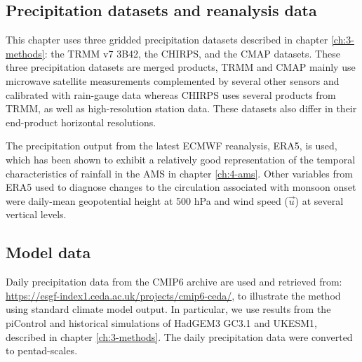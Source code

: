 \subsection{Precipitation datasets and reanalysis data}

This chapter uses three gridded precipitation datasets described in chapter \ref{ch:3-methods}: the TRMM v7 3B42, the CHIRPS, and the CMAP datasets.
These three precipitation datasets are merged products, TRMM and CMAP mainly use microwave satellite measurements complemented by several other sensors and calibrated with rain-gauge data whereas CHIRPS uses several products from TRMM, as well as high-resolution station data. These datasets also differ in their end-product horizontal resolutions.

The precipitation output from the latest ECMWF reanalysis, ERA5, is used, which has been shown to exhibit a relatively good representation of the temporal characteristics of rainfall in the AMS in chapter \ref{ch:4-ams}. 
Other variables from ERA5 used to diagnose changes to the circulation associated with monsoon onset were daily-mean geopotential height at 500 hPa and wind speed ($\vec{u}$) at several vertical levels. 

\subsection{Model data}


Daily precipitation data from the CMIP6 archive are used and retrieved from: \url{https://esgf-index1.ceda.ac.uk/projects/cmip6-ceda/}, to illustrate the method using standard climate model output.
In particular, we use results from the piControl and historical simulations of HadGEM3 GC3.1 and UKESM1, described in chapter \ref{ch:3-methods}.
The daily precipitation data were converted to pentad-scales.


